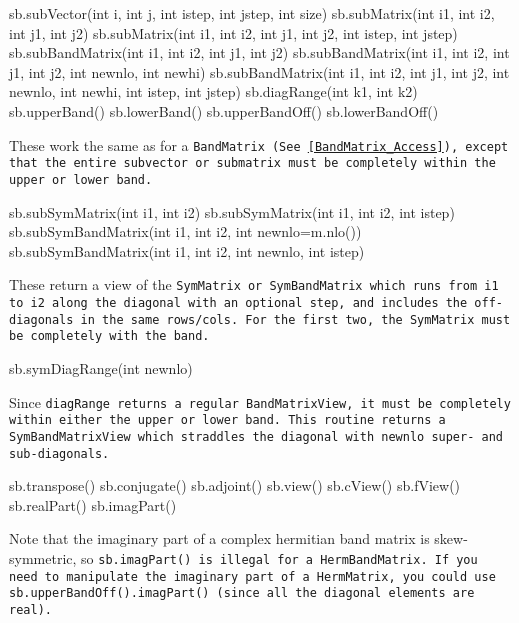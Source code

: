 \begin{tmvcode}
sb.subVector(int i, int j, int istep, int jstep, int size)
sb.subMatrix(int i1, int i2, int j1, int j2)
sb.subMatrix(int i1, int i2, int j1, int j2, int istep, int jstep)
sb.subBandMatrix(int i1, int i2, int j1, int j2)
sb.subBandMatrix(int i1, int i2, int j1, int j2, int newnlo, int newhi)
sb.subBandMatrix(int i1, int i2, int j1, int j2, int newnlo, int newhi, 
      int istep, int jstep)
sb.diagRange(int k1, int k2)
sb.upperBand()
sb.lowerBand()
sb.upperBandOff()
sb.lowerBandOff()
\end{tmvcode}
These work the same as for a \tt{BandMatrix}
(See \ref{BandMatrix_Access}),
except that the entire
subvector or submatrix must be completely within the upper or lower band.


\begin{tmvcode}
sb.subSymMatrix(int i1, int i2)
sb.subSymMatrix(int i1, int i2, int istep)
sb.subSymBandMatrix(int i1, int i2, int newnlo=m.nlo())
sb.subSymBandMatrix(int i1, int i2, int newnlo, int istep)
\end{tmvcode}
These return a view of the \tt{SymMatrix} or \tt{SymBandMatrix} which runs
from \tt{i1} to \tt{i2} along the diagonal with an optional step,
and includes the off-diagonals in the same rows/cols.  For the first two,
the \tt{SymMatrix} must be completely with the band.

\begin{tmvcode}
sb.symDiagRange(int newnlo)
\end{tmvcode}
Since \tt{diagRange} returns a regular \tt{BandMatrixView}, it must be completely
within either the upper or lower band.  This routine returns a \tt{SymBandMatrixView}
which straddles the diagonal with \tt{newnlo} super- and sub-diagonals.

\begin{tmvcode}
sb.transpose()
sb.conjugate()
sb.adjoint()
sb.view()
sb.cView()
sb.fView()
sb.realPart()
sb.imagPart()
\end{tmvcode}
Note that the imaginary part of a complex hermitian band matrix is
skew-symmetric, so \tt{sb.imagPart()} is illegal for a \tt{HermBandMatrix}.
If you need to manipulate the imaginary part of a \tt{HermMatrix}, 
you could use
\tt{sb.upperBandOff().imagPart()} 
(since all the diagonal elements are real).
\vspace{12pt}

